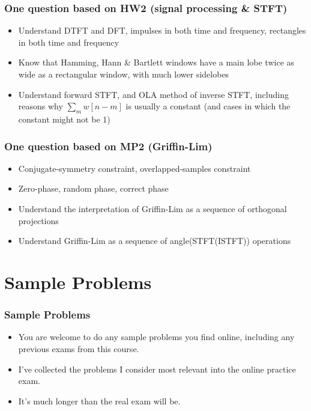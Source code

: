 \documentclass{beamer}
\begin{document}
\begin{frame}
  \frametitle{One question based on HW2 (signal processing \& STFT)}

  \begin{itemize}
  \item Understand DTFT and DFT, impulses in both time and frequency,
    rectangles in both time and frequency
  \item Know that Hamming, Hann \& Bartlett windows have a main lobe
    twice as wide as a rectangular window, with much lower sidelobes
  \item Understand forward STFT, and OLA method of inverse STFT,
    including reasons why $\sum_m w[n-m]$ is usually a constant (and
    cases in which the constant might not be 1)
  \end{itemize}
\end{frame}

\begin{frame}
  \frametitle{One question based on MP2 (Griffin-Lim)}

  \begin{itemize}
  \item Conjugate-symmetry constraint, overlapped-samples constraint
  \item Zero-phase, random phase, correct phase
  \item Understand the interpretation of Griffin-Lim as a sequence of
    orthogonal projections
  \item Understand Griffin-Lim as a sequence of angle(STFT(ISTFT))
    operations
  \end{itemize}
\end{frame}

\section[Sample Problems]{Sample Problems}
\setcounter{subsection}{1}

\begin{frame}
  \frametitle{Sample Problems}

  \begin{itemize}
  \item You are welcome to do any sample problems you find online,
    including any previous exams from this course.
  \item I've collected the problems I consider most relevant into the
    online practice exam.
  \item It's much longer than the real exam will be.
  \end{itemize}
\end{frame}
\end{document}
